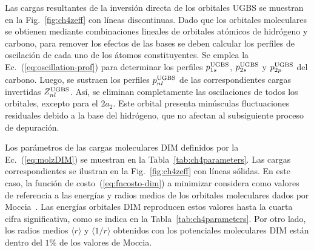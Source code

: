 Las cargas resultantes de la inversión directa de los orbitales UGBS 
se muestran en la Fig.~\ref{fig:ch4zeff} con líneas discontinuas. Dado 
que los orbitales moleculares se obtienen mediante combinaciones 
lineales de orbitales atómicos de hidrógeno y carbono, para remover los 
efectos de las bases se deben calcular los perfiles de oscilación de 
cada uno de los átomos constituyentes. Se emplea la 
Ec.~(\ref{eq:oscillation-prof}) para determinar los perfiles 
$p_{1s}^{\mbox{\scriptsize UGBS}}$, $p_{2s}^{\mbox{\scriptsize UGBS}}$ y 
$p_{2p}^{\mbox{\scriptsize UGBS}}$ del carbono. Luego, se sustraen los 
perfiles $p_{nl}^{\mbox{\scriptsize UGBS}}$ de las correspondientes 
cargas invertidas $Z_{nl}^{\mbox{\scriptsize UGBS}}$. Así, se eliminan 
completamente las oscilaciones de todos los orbitales, excepto para el 
$2a_2$. Este orbital presenta minúsculas fluctuaciones residuales debido 
a la base del hidrógeno, que no afectan al subsiguiente proceso de 
depuración.

Los parámetros de las cargas moleculares DIM definidos por la 
Ec.~(\ref{eq:molzDIM}) se muestran en la Tabla~\ref{tab:ch4parameters}. 
Las cargas correspondientes se ilustran en la Fig.~\ref{fig:ch4zeff} con 
líneas sólidas. En este caso, la función de costo~(\ref{eq:fncosto-dim}) 
a minimizar considera como valores de referencia a las energías y radios 
medios de los orbitales moleculares dados por Moccia~\cite{Moccia:69}. 
Las energías orbitales DIM reproducen estos valores hasta la cuarta 
cifra significativa, como se indica en la Tabla~\ref{tab:ch4parameters}. 
Por otro lado, los radios medios $\langle r\rangle$ y 
$\langle 1/r\rangle$ obtenidos con los potenciales moleculares DIM están 
dentro del $1\%$ de los valores de Moccia.

